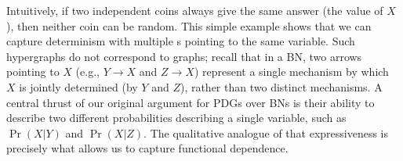 Intuitively, if two independent coins always give the same answer (the value of $X$), then neither coin can be random. 
This simple example shows that we can capture determinism with multiple \arc s pointing to the same variable.
Such hypergraphs do not correspond to graphs; 
    recall that in a BN, two arrows pointing to $X$
    (e.g., $Y \to X$ and $Z \to X$)
    represent a single mechanism by which $X$ is jointly determined
        (by $Y$ and $Z$),
    rather than two distinct mechanisms.
A central thrust of
our original argument for
PDGs over BNs is their
    ability to describe two different probabilities describing a single variable,
    such as $\Pr(X|Y)$ and $\Pr(X|Z)$.
The qualitative analogue of that expressiveness is precisely what allows us to capture functional dependence.


